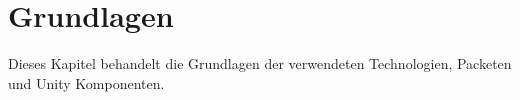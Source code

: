 \chapter{Grundlagen}
\label{sec:grundlagen}
Dieses Kapitel behandelt die Grundlagen der verwendeten Technologien, Packeten und Unity Komponenten.




